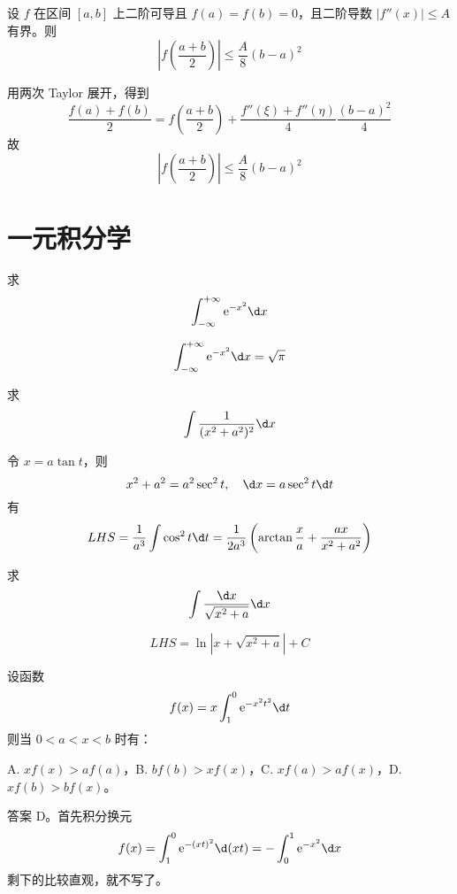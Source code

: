 \begin{problem}[000043]
设 $f$ 在区间 $[a, b]$ 上二阶可导且 $f(a) = f(b) = 0$，且二阶导数 $|f''(x)| \leqslant A$ 有界。则
\[ \left| f\left(\frac{a+b}{2}\right) \right| \leqslant \frac{A}{8}(b- a)^2 \]
\end{problem}

\begin{solution}
	用两次 Taylor 展开，得到
	\[ \frac{f(a) + f(b)}{2} = f\left(\frac{a+b}{2}\right) + \frac{f''(\xi) + f''(\eta)}{4}\frac{(b - a)^2}{4} \]
	故
	\[ \left| f\left(\frac{a+b}{2}\right) \right| \leqslant \frac{A}{8}(b- a)^2 \]
\end{solution}

\section{一元积分学}

\begin{problem}[000008]
求
\[ \int_{-\infty}^{+\infty} \ee^{-x^2}\d x \]
\end{problem}
\begin{solution}
	\[ \int_{-\infty}^{+\infty} \ee^{-x^2}\d x = \sqrt{\pi} \]
\end{solution}

\begin{problem}[000014]
求
\[ \int \frac{1}{(x^2+a^2)^2} \d x \]
\end{problem}
\begin{solution}
	令 $x = a \tan t$，则
	\[ x^2 + a^2 = a^2 \sec^2 t, \quad \d x = a \sec^2 t \d t \]
	有
	\[ LHS =  \frac{1}{a^3}\int \cos^2 t \d t = \frac{1}{2a^3} \left( \arctan \frac{x}{a} + \frac{ax}{x^2+a^2} \right) \]
\end{solution}


\begin{problem}[000015]
求
\[ \int \frac{\d x}{\sqrt{x^2 + a}} \d x \]
\end{problem}
\begin{solution}
	\[ LHS =  \ln |x + \sqrt{x^2+a}| + C \]
\end{solution}


\begin{problem}[000022]
设函数
\[ f(x) = x \int_{1}^{0} \ee^{-x^2t^2} \d t \]
则当 $0<a<x<b$ 时有：

A. $xf(x) > af(a)$，B. $bf(b) > x f(x)$，C. $xf(a) > af(x)$，D. $xf(b) > bf(x)$。
\end{problem}

\begin{solution}
	答案 D。首先积分换元
	\[ f(x) = \int_{1}^{0} \ee^{-(xt)^2} \d (xt) = -\int_{0}^{1} \ee^{-x^2} \d x  \]
	剩下的比较直观，就不写了。
\end{solution}



